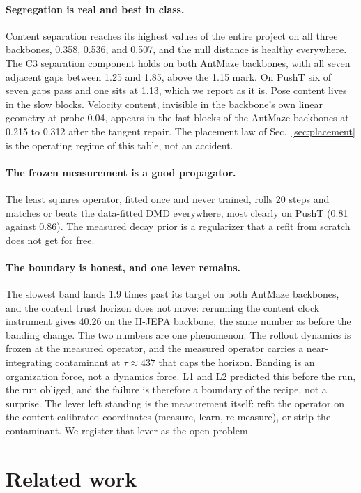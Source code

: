 \documentclass[11pt]{article}
\newcommand{\tauc}{\tau}
\begin{document}
\paragraph{Segregation is real and best in class.}
Content separation reaches its highest values of the entire project on all three backbones, 0.358, 0.536, and 0.507, and the null distance is healthy everywhere.
The C3 separation component holds on both AntMaze backbones, with all seven adjacent gaps between 1.25 and 1.85, above the 1.15 mark.
On PushT six of seven gaps pass and one sits at 1.13, which we report as it is.
Pose content lives in the slow blocks.
Velocity content, invisible in the backbone's own linear geometry at probe 0.04, appears in the fast blocks of the AntMaze backbones at 0.215 to 0.312 after the tangent repair.
The placement law of Sec.~\ref{sec:placement} is the operating regime of this table, not an accident.

\paragraph{The frozen measurement is a good propagator.}
The least squares operator, fitted once and never trained, rolls 20 steps and matches or beats the data-fitted DMD everywhere, most clearly on PushT (0.81 against 0.86).
The measured decay prior is a regularizer that a refit from scratch does not get for free.

\paragraph{The boundary is honest, and one lever remains.}
The slowest band lands 1.9 times past its target on both AntMaze backbones, and the content trust horizon does not move: rerunning the content clock instrument gives 40.26 on the H-JEPA backbone, the same number as before the banding change.
The two numbers are one phenomenon.
The rollout dynamics is frozen at the measured operator, and the measured operator carries a near-integrating contaminant at $\tauc \approx 437$ that caps the horizon.
Banding is an organization force, not a dynamics force.
L1 and L2 predicted this before the run, the run obliged, and the failure is therefore a boundary of the recipe, not a surprise.
The lever left standing is the measurement itself: refit the operator on the content-calibrated coordinates (measure, learn, re-measure), or strip the contaminant.
We register that lever as the open problem.

\section{Related work}
\label{sec:related}
\end{document}
